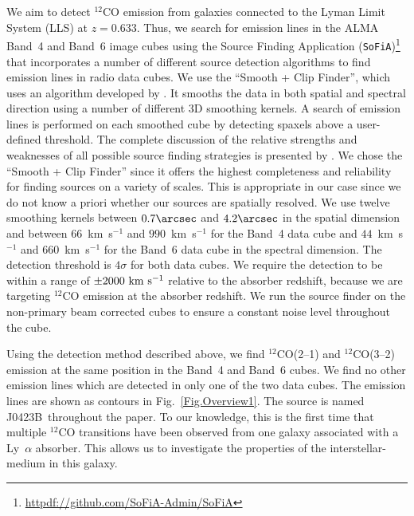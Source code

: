 \documentclass[a4paper,fleqn,usenatbib]{mnras}
\newcommand{\GalB}{J0423B}
\begin{document}
We aim to detect $^{12}$CO emission from galaxies connected to the Lyman Limit System (LLS) at $z = 0.633$. Thus, we search for emission lines in the ALMA Band~4 and Band~6 image cubes using the Source Finding Application (\texttt{SoFiA})\footnote{\url{httpdf://github.com/SoFiA-Admin/SoFiA}} \mbox{\citep{Serra2015SOFIA}} that incorporates a number of different source detection algorithms to find emission lines in radio data cubes. 
We use the ``Smooth + Clip Finder'', which uses an algorithm developed by \mbox{\citet{Serra2012atlas3D}}. It smooths the data in both spatial and spectral direction using a number of different 3D smoothing kernels. A search of emission lines is performed on each smoothed cube by detecting spaxels above a user-defined threshold. The complete discussion of the relative strengths and weaknesses of all possible source finding strategies is presented by \mbox{\citet{Popping2012comparison}}. We chose the ``Smooth + Clip Finder'' since it offers the highest completeness and reliability for finding sources on a variety of scales. This is appropriate in our case since we do not know a priori whether our sources are spatially resolved. We use twelve smoothing kernels between $0.7 \arcsec$ and $4.2 \arcsec$ in the spatial dimension and between $66$~km~s$^{-1}$  and $990$~km~s$^{-1}$ for the Band~4 data cube and $44$~km~s$^{-1}$  and $660$~km~s$^{-1}$ for the Band~6 data cube in the spectral dimension. The detection threshold is $4\sigma$ for both data cubes.
We require the detection to be within a range of $\pm 2000 \rm{~km~s^{-1}}$ relative to the absorber redshift, because we are targeting $^{12}$CO emission at the absorber redshift. We run the source finder on the non-primary beam corrected cubes to ensure a constant noise level throughout the cube.

\label{SecCOlines}


Using the detection method described above, we find \mbox{$^{12}$CO(2--1)} and $^{12}$CO(3--2) emission at the same position in the Band~4 and Band~6 cubes. We find no other emission lines which are detected in only one of the two data cubes. The emission lines are shown as contours in Fig.~\ref{Fig.Overview1}. The source is named \GalB\ throughout the paper. To our knowledge, this is the first time that multiple $^{12}$CO transitions have been observed from one galaxy associated with a Ly~$\alpha$ absorber. This allows us to investigate the properties of the interstellar-medium in this galaxy.
\end{document}

